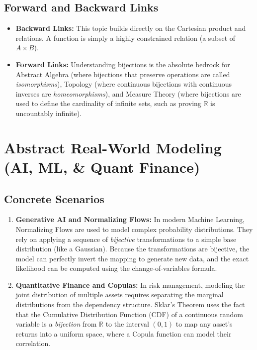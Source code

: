 \documentclass[11pt, a4paper]{article}
\theoremstyle{definition}
\theoremstyle{remark}
\newcommand{\R}{\mathbb{R}}
\begin{document}
\subsection{Forward and Backward Links}
\begin{itemize}
    \item \textbf{Backward Links:} This topic builds directly on the Cartesian product and relations. A function is simply a highly constrained relation (a subset of $A \times B$).
    \item \textbf{Forward Links:} Understanding bijections is the absolute bedrock for Abstract Algebra (where bijections that preserve operations are called \textit{isomorphisms}), Topology (where continuous bijections with continuous inverses are \textit{homeomorphisms}), and Measure Theory (where bijections are used to define the cardinality of infinite sets, such as proving $\R$ is uncountably infinite).
\end{itemize}

\section{Abstract Real-World Modeling (AI, ML, \& Quant Finance)}

\subsection{Concrete Scenarios}
\begin{enumerate}
    \item \textbf{Generative AI and Normalizing Flows:} In modern Machine Learning, Normalizing Flows are used to model complex probability distributions. They rely on applying a sequence of \textit{bijective} transformations to a simple base distribution (like a Gaussian). Because the transformations are bijective, the model can perfectly invert the mapping to generate new data, and the exact likelihood can be computed using the change-of-variables formula.
    \item \textbf{Quantitative Finance and Copulas:} In risk management, modeling the joint distribution of multiple assets requires separating the marginal distributions from the dependency structure. Sklar's Theorem uses the fact that the Cumulative Distribution Function (CDF) of a continuous random variable is a \textit{bijection} from $\R$ to the interval $(0, 1)$ to map any asset's returns into a uniform space, where a Copula function can model their correlation.
\end{enumerate}
\end{document}
